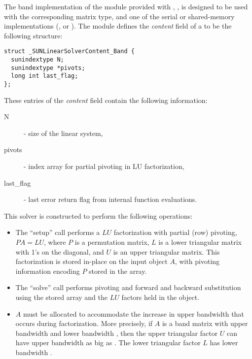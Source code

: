 
The band implementation of the {\sunlinsol} module provided with
{\sundials}, {\sunlinsolband}, is designed to be used with the
corresponding {\sunmatband} matrix type, and one of the serial or
shared-memory {\nvector} implementations ({\nvecs}, {\nvecopenmp} or
{\nvecpthreads}).  The {\sunlinsolband} module defines the {\em
content} field of a  to be the following structure:
\begin{verbatim} 
struct _SUNLinearSolverContent_Band {
  sunindextype N;
  sunindextype *pivots;
  long int last_flag;
};
\end{verbatim}
These entries of the \emph{content} field contain the following
information:
\begin{description}
  \item[N] - size of the linear system,
  \item[pivots] - index array for partial pivoting in LU factorization,
  \item[last\_flag] - last error return flag from internal function evaluations.
\end{description}

This solver is constructed to perform the following operations:
\begin{itemize}
\item The ``setup'' call performs a $LU$ factorization with
  partial (row) pivoting, $PA=LU$, where $P$ is a permutation matrix,
  $L$ is a lower triangular matrix with 1's on the diagonal, and $U$
  is an upper triangular matrix.  This factorization is stored
  in-place on the input {\sunmatband} object $A$, with pivoting
  information encoding $P$ stored in the  array.
\item The ``solve'' call performs pivoting and forward and
  backward substitution using the stored  array and the
  $LU$ factors held in the {\sunmatband} object.
\item
  {\warn} $A$ must be allocated to accommodate the increase in upper
  bandwidth that occurs during factorization.  More precisely, if $A$
  is a band matrix with upper bandwidth  and lower bandwidth
  , then the upper triangular factor $U$ can have upper
  bandwidth as big as . The lower triangular
  factor $L$ has lower bandwidth .
\end{itemize}



